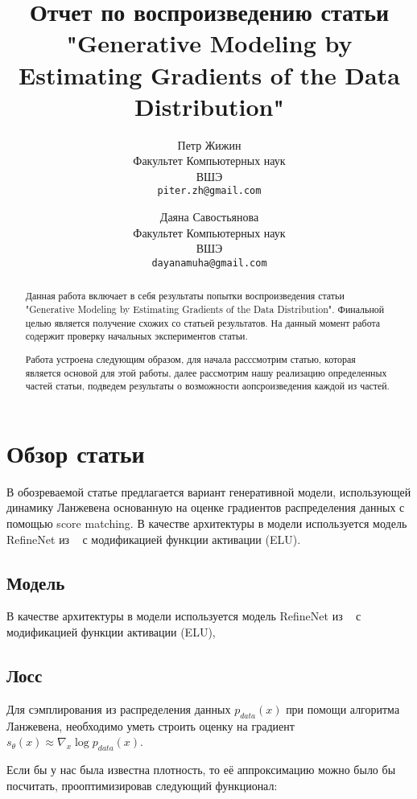 \documentclass{article}
\title{Отчет по воспроизведению статьи "Generative Modeling by Estimating Gradients of the Data Distribution"}
\author{%
  Петр Жижин \\
  Факультет Компьютерных наук\\
  ВШЭ\\
  \texttt{piter.zh@gmail.com} \\
   \and
   Даяна Савостьянова \\
   Факультет Компьютерных наук\\
   ВШЭ\\
   \texttt{dayanamuha@gmail.com} \\
}
\begin{document}

\maketitle

\begin{abstract}
  Данная работа включает в себя результаты попытки воспроизведения статьи 
  "Generative Modeling by Estimating Gradients of the Data Distribution". Финальной целью является получение схожих со статьей результатов. На данный момент работа содержит проверку начальных экспериментов статьи.
  
  Работа устроена следующим образом, для начала расссмотрим статью, которая является основой для этой работы, далее рассмотрим нашу реализацию определенных частей статьи, подведем результаты о возможности аопсроизведения каждой из частей.
\end{abstract}


\section{Обзор статьи}

В обозреваемой статье предлагается вариант генеративной модели, использующей динамику Ланжевена основанную на оценке градиентов распределения данных с помощью score matching. В качестве архитектуры в модели используется модель RefineNet из ~\cite{DBLP:journals/corr/LinMS016} с модификацией функции активации (ELU).

\subsection{Модель}

В качестве архитектуры в модели используется модель RefineNet из ~\cite{DBLP:journals/corr/LinMS016} с модификацией функции активации (ELU),


\subsection{Лосс}

Для сэмплирования из распределения данных $p_{data}(x)$ при помощи алгоритма
Ланжевена, необходимо уметь строить оценку на градиент
$s_{\theta}(x) \approx \nabla_x \log p_{data}(x)$.

Если бы у нас была известна плотность, то её аппроксимацию можно было бы
посчитать, прооптимизировав следующий функционал:
\end{document}
